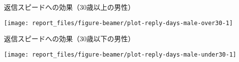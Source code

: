 \documentclass[
      aspectratio=169,
        12pt,
    ]{beamer}
\begin{document}
\begin{frame}{返信スピードへの効果（30歳以上の男性）}
\protect\hypertarget{ux8fd4ux4fe1ux30b9ux30d4ux30fcux30c9ux3078ux306eux52b9ux679c30ux6b73ux4ee5ux4e0aux306eux7537ux6027}{}
\begin{center}\texttt{[image: report\_files/figure-beamer/plot-reply-days-male-over30-1]} \end{center}
\end{frame}

\begin{frame}{返信スピードへの効果（30歳以下の男性）}
\protect\hypertarget{ux8fd4ux4fe1ux30b9ux30d4ux30fcux30c9ux3078ux306eux52b9ux679c30ux6b73ux4ee5ux4e0bux306eux7537ux6027}{}
\begin{center}\texttt{[image: report\_files/figure-beamer/plot-reply-days-male-under30-1]} \end{center}
\end{frame}
\end{document}
